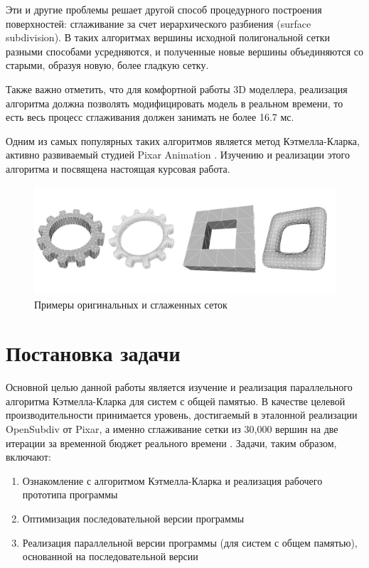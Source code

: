 \documentclass[14pt]{extarticle}
\begin{document}
Эти и другие проблемы решает другой способ процедурного построения поверхностей: сглаживание за счет иерархического разбиения (surface subdivision). В таких алгоритмах вершины исходной полигональной сетки разными способами усредняются, и полученные новые вершины объединяются со старыми, образуя новую, более гладкую сетку.

Также важно отметить, что для комфортной работы 3D моделлера, реализация алгоритма должна позволять модифицировать модель в реальном времени, то есть весь процесс сглаживания должен занимать не более 16.7 мс.

Одним из самых популярных таких алгоритмов является метод Кэтмелла-Кларка, активно развиваемый студией Pixar Animation \cite{catmark79}. Изучению и реализации этого алгоритма и посвящена настоящая курсовая работа.

\begin{figure}[H]
    \centering
    \includegraphics[scale=1.0]{gear_and_ct.png}
    \caption{Примеры оригинальных и сглаженных сеток}
\end{figure}

\newpage

\section{Постановка задачи}
Основной целью данной работы является изучение и реализация параллельного алгоритма Кэтмелла-Кларка для систем с общей памятью. В качестве целевой производительности принимается уровень, достигаемый в эталонной реализации OpenSubdiv от Pixar, а именно сглаживание сетки из 30,000 вершин на две итерации за временной бюджет реального времени \cite{opensubdivWWW}. Задачи, таким образом, включают:
\begin{enumerate}
    \item Ознакомление с алгоритмом Кэтмелла-Кларка и реализация рабочего прототипа программы
    \item Оптимизация последовательной версии программы
    \item Реализация параллельной версии программы (для систем с общем памятью), основанной на последовательной версии
\end{enumerate}
\end{document}
